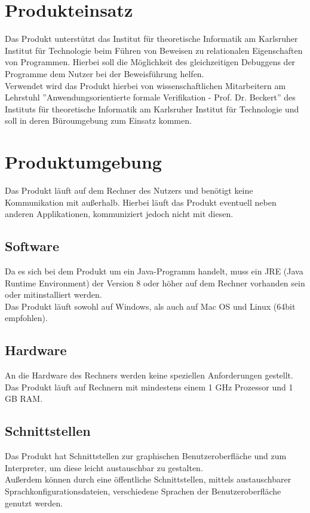 \documentclass[parskip=full]{scrartcl}
\begin{document}
\section{Produkteinsatz}
Das Produkt unterstützt das Institut für theoretische Informatik am Karlsruher Institut für Technologie beim Führen von Beweisen zu relationalen Eigenschaften von Programmen. Hierbei soll die Möglichkeit des gleichzeitigen Debuggens der Programme dem Nutzer bei der Beweisführung helfen. \\
Verwendet wird das Produkt hierbei von wissenschaftlichen Mitarbeitern am Lehrstuhl ''Anwendungsorientierte formale Verifikation - Prof. Dr. Beckert'' des Instituts für theoretische Informatik am Karlsruher Institut für Technologie und soll in deren Büroumgebung zum Einsatz kommen. 

 

\section{Produktumgebung}
Das Produkt läuft auf dem Rechner des Nutzers und benötigt keine Kommunikation mit außerhalb. Hierbei läuft das Produkt eventuell neben anderen Applikationen, kommuniziert jedoch nicht mit diesen.

\subsection{Software}
Da es sich bei dem Produkt um ein Java-Programm handelt, muss ein JRE (Java Runtime Environment) der Version 8 oder höher auf dem Rechner vorhanden sein oder mitinstalliert werden. \\
Das Produkt läuft sowohl auf Windows, als auch auf Mac OS und Linux (64bit empfohlen).

\subsection{Hardware}
An die Hardware des Rechners werden keine speziellen Anforderungen gestellt. Das Produkt läuft auf Rechnern mit mindestens einem 1 GHz Prozessor und 1 GB RAM.

\subsection{Schnittstellen}
Das Produkt hat Schnittstellen zur graphischen Benutzeroberfläche und zum Interpreter, um diese leicht austauschbar zu gestalten. \\
Außerdem können durch eine öffentliche Schnittstellen, mittels austauschbarer Sprachkonfigurationsdateien, verschiedene Sprachen der Benutzeroberfläche genutzt werden. 
\end{document}

